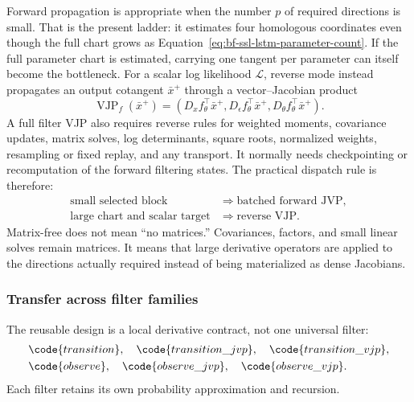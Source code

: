 Forward propagation is appropriate when the number $p$ of required
directions is small.  That is the present ladder: it estimates four homologous
coordinates even though the full chart grows as
Equation~\eqref{eq:bf-ssl-lstm-parameter-count}.  If the full parameter chart
is estimated, carrying one tangent per parameter can itself become the
bottleneck.  For a scalar log likelihood $\mathcal L$, reverse mode instead
propagates an output cotangent $\bar x^+$ through a vector--Jacobian product
\begin{equation}
  \operatorname{VJP}_{f}(\bar x^+)
  =\left(
     D_xf_\theta^\top\bar x^+,
     D_\epsilon f_\theta^\top\bar x^+,
     D_\theta f_\theta^\top\bar x^+
   \right).
  \label{eq:bf-ssl-lstm-transition-vjp}
\end{equation}
A full filter VJP also requires reverse rules for weighted moments, covariance
updates, matrix solves, log determinants, square roots, normalized weights,
resampling or fixed replay, and any transport.  It normally needs
checkpointing or recomputation of the forward filtering states.  The practical
dispatch rule is therefore:
\begin{equation}
  \begin{aligned}
    \text{small selected block}
      &\Rightarrow \text{batched forward JVP},\\
    \text{large chart and scalar target}
      &\Rightarrow \text{reverse VJP}.
  \end{aligned}
  \label{eq:bf-ssl-lstm-jvp-vjp-dispatch}
\end{equation}
Matrix-free does not mean ``no matrices.''  Covariances, factors, and small
linear solves remain matrices.  It means that large derivative operators are
applied to the directions actually required instead of being materialized as
dense Jacobians.

\subsubsection{Transfer across filter families}

The reusable design is a local derivative contract, not one universal filter:
\begin{align*}
  &\code{transition},\quad \code{transition\_jvp},\quad
    \code{transition\_vjp},\\
  &\code{observe},\quad \code{observe\_jvp},\quad
    \code{observe\_vjp}.
\end{align*}
Each filter retains its own probability approximation and recursion.

